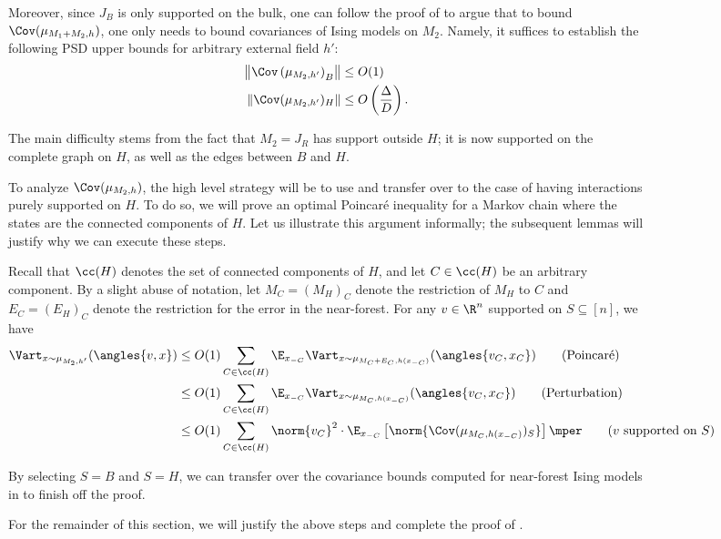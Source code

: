 \documentclass[11pt,letterpaper]{article}
\begin{document}
\begin{figure}
\begin{figure}
Moreover, since $J_B$ is only supported on the bulk, one can follow the proof of  to argue that to bound $\Cov(\mu_{M_1 + M_2, h})$, one only needs to bound covariances of Ising models on $M_2$. 
Namely, it suffices to establish the following PSD upper bounds for arbitrary external field $h'$:
\begin{align*}
    \left\| \Cov\left( \mu_{M_2,h'} \right)_B \right\| &\le O(1) \\
    \left\|\Cov(\mu_{M_2,h'})_H\right\| &\le O\left(\frac{\Delta}{D}\right).
\end{align*}

The main difficulty stems from the fact that $M_2 = J_R$ has support outside $H$; it is now supported on the complete graph on $H$, as well as the edges between $B$ and $H$.


To analyze $\Cov(\mu_{M_2, h})$, the high level strategy will be to use  and transfer over to the case of having interactions purely supported on $H$. 
To do so, we will prove an optimal Poincar\'{e} inequality for a Markov chain where the states are the connected components of $H$.
Let us illustrate this argument informally; the subsequent lemmas will justify why we can execute these steps.

Recall that $\cc(H)$ denotes the set of connected components of $H$, and let $C \in \cc(H)$ be an arbitrary component.
By a slight abuse of notation, let $M_C = (M_H)_{C}$ denote the restriction of $M_H$ to $C$ and $E_C = (E_H)_{C}$ denote the restriction for the error in the near-forest. 
For any $v \in \R^n$ supported on $S \subseteq [n]$, we have
\begin{align*}
    \Vart_{x \sim \mu_{M_2, h'}}(\angles{v, x}) &\le O(1) \sum_{C \in \cc(H)} \E_{x_{-C}} \Vart_{x \sim \mu_{M_C + E_C, h(x_{-C})}}(\angles{v_C, x_C}) \tag*{(\text{Poincar\'{e}})}\\
    &\le O(1) \sum_{C \in \cc(H)} \E_{x_{-C}} \Vart_{x \sim \mu_{M_C, h(x_{-C})}}(\angles{v_C, x_C}) \tag*{(\text{Perturbation})} \\
    &\le O(1) \sum_{C \in \cc(H)} \norm{v_C}^2 \cdot \E_{x_{-C}} \left[\norm{\Cov(\mu_{M_C, h(x_{-C})})_{S}}\right] \mper \tag*{(\text{$v$ supported on $S$})}
\end{align*}

By selecting $S = B$ and $S = H$, we can transfer over the covariance bounds computed for near-forest Ising models in  to finish off the proof. 

For the remainder of this section, we will justify the above steps and complete the proof of .


\end{figure}
\end{figure}
\end{document}
